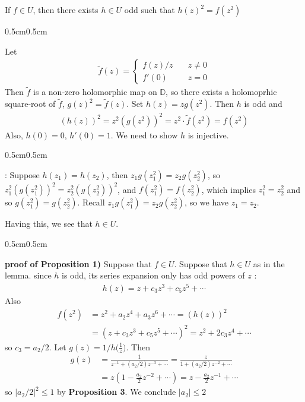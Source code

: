 \documentclass[12pt,a4paper]{article}
\newenvironment{proof}
{\begin{changemargin}{0.5cm}{0.5cm} 
	}%
	{\end{changemargin}
}
\newenvironment{subproof}
{\begin{changemargin}{0.5cm}{0.5cm} 
	}%
	{\end{changemargin}
}
\newenvironment{p}
{\begin{proof} 
	}%
	{\end{proof}
}
\begin{document}
\lem If $f\in U$, then there exists $h\in U$ odd such that $h(z)^2 = f(z^2)$
\begin{p}
\pf Let
\begin{align*}
\tilde{f}(z) = \begin{cases}
f(z) /z \quad & z\neq 0 \\
f'(0) \quad & z=0 
\end{cases}
\end{align*}
Then $\tilde{f}$ is a non-zero holomorphic map on $\mathbb{D}$, so there exists a holomoprhic square-root of $\tilde{f}$, $g(z)^2 = \tilde{f}(z)$.  Set $h(z) = zg(z^2)$. Then $h$ is odd and
\begin{align*}
(h(z))^2 = z^2 (g(z^2))^2 = z^2 \cdot \tilde{f}(z^2) = f(z^2)
\end{align*}
Also, $h(0)=0$, $h'(0)=1$. We need to show $h$ is injective.
\begin{subproof}
: Suppose $h(z_1)= h(z_2)$, then $z_1 g(z_1^2) = z_2 g(z_2^2)$, so $z_1^2(g(z_1^2))^2 = z_2^2(g(z_2^2))^2$, and $f(z_1^2) = f(z_2^2)$, which implies $z_1^2 = z_2^2$ and so $g(z_1^2) = g(z_2^2)$. Recall $z_1g(z_1^2) = z_2 g(z_2^2)$, so we have $z_1 =z_2$.
\end{subproof}
Having this, we see that $h\in U$.

\eop
\end{p}
\s

\begin{p}
\textbf{proof of Proposition 1)} Suppose that $f\in U$. Suppose that $h\in U$ as in the lemma. since $h$ is odd, its series expansion only has odd powers of $z$ :
\begin{align*}
h(z) = z+ c_3 z^3 + c_5 z^5 + \cdots
\end{align*}
Also 
\begin{align*}
f(z^2) &= z^2 + a_2 z^4 + a_3 z^6 + \cdots = (h(z))^2 \\
&= (z+ c_3 z^3 + c_5 z^5 + \cdots)^2 = z^2 + 2c_3 z^4 +\cdots
\end{align*}
so $c_3 = a_2/2$. Let $g(z) = 1/h\Big(\frac{1}{z}\Big)$. Then
\begin{align*}
g(z) &= \frac{1}{z^{-1} + (a_2/2)z^{-3} + \cdots} = \frac{z}{1+(a_2/2)z^{-2} + \cdots}\\
&= z(1- \frac{a_2}{2}z^{-2} + \cdots) = z- \frac{a_2}{2}z^{-1} + \cdots
\end{align*}
so $|a_2/2|^2 \leq 1$ by \textbf{Proposition 3}. We conclude $|a_2| \leq 2$

\eop
\end{p}
\s
\end{document}
